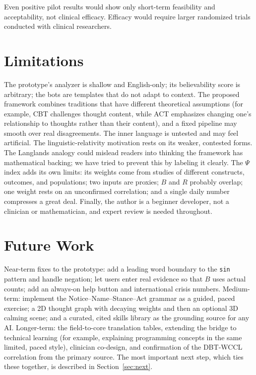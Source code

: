 \documentclass[11pt]{article}
\begin{document}
Even positive pilot results would show only short-term feasibility and acceptability, not clinical efficacy. Efficacy would require larger randomized trials conducted with clinical researchers.

\section{Limitations}
The prototype's analyzer is shallow and English-only; its believability score is arbitrary; the bots are templates that do not adapt to context. The proposed framework combines traditions that have different theoretical assumptions (for example, CBT challenges thought content, while ACT emphasizes changing one's relationship to thoughts rather than their content), and a fixed pipeline may smooth over real disagreements. The inner language is untested and may feel artificial. The linguistic-relativity motivation rests on its weaker, contested forms. The Langlands analogy could mislead readers into thinking the framework has mathematical backing; we have tried to prevent this by labeling it clearly. The $\Psi$ index adds its own limits: its weights come from studies of different constructs, outcomes, and populations; two inputs are proxies; $B$ and $R$ probably overlap; one weight rests on an unconfirmed correlation; and a single daily number compresses a great deal. Finally, the author is a beginner developer, not a clinician or mathematician, and expert review is needed throughout.

\section{Future Work}
Near-term fixes to the prototype: add a leading word boundary to the \texttt{sin} pattern and handle negation; let users enter real evidence so that $B$ uses actual counts; add an always-on help button and international crisis numbers. Medium-term: implement the Notice--Name--Stance--Act grammar as a guided, paced exercise; a 2D thought graph with decaying weights and then an optional 3D calming scene; and a curated, cited skills library as the grounding source for any AI. Longer-term: the field-to-core translation tables, extending the bridge to technical learning (for example, explaining programming concepts in the same limited, paced style), clinician co-design, and confirmation of the DBT-WCCL correlation from the primary source. The most important next step, which ties these together, is described in Section~\ref{sec:next}.
\end{document}
